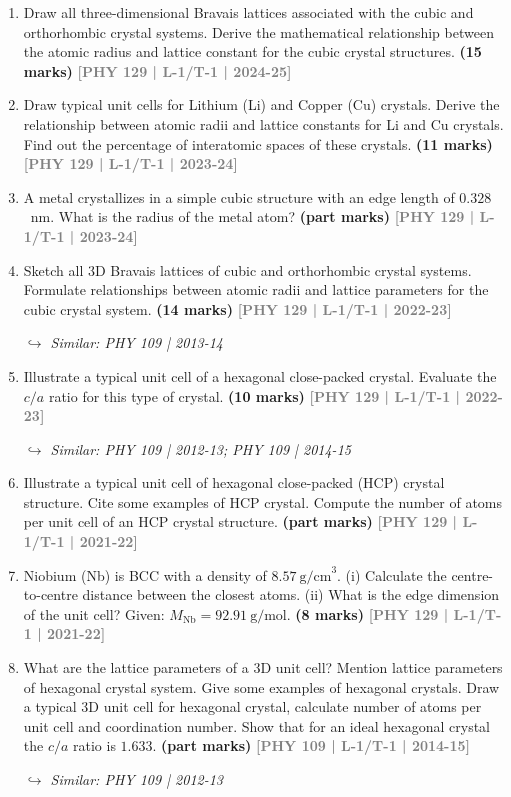 \documentclass[12pt,a3paper]{article}
\newcommand{\yr}[1]{\hfill\textcolor{gray}{\small\textbf{[#1]}}}
\newcommand{\mk}[1]{\textcolor{orange!70!black}{\small\textbf{(#1 marks)}}}
\newcommand{\variant}[1]{\par\vspace{1pt}\textcolor{blue!50!black}%
  {\footnotesize\textit{$\hookrightarrow$ Similar: #1}}}
\begin{document}
\begin{enumerate}

\item Draw all three-dimensional Bravais lattices associated with the cubic and
orthorhombic crystal systems. Derive the mathematical relationship between the
atomic radius and lattice constant for the cubic crystal structures.
\mk{15} \yr{PHY 129 | L-1/T-1 | 2024-25}


\item Draw typical unit cells for Lithium (Li) and Copper (Cu) crystals. Derive the relationship between atomic radii and lattice constants for Li and Cu crystals. Find out the percentage of interatomic spaces of these crystals.
\mk{11} \yr{PHY 129 | L-1/T-1 | 2023-24}

\item A metal crystallizes in a simple cubic structure with an edge length of $0.328$~nm. What is the radius of the metal atom?
\mk{part} \yr{PHY 129 | L-1/T-1 | 2023-24}

\item Sketch all 3D Bravais lattices of cubic and orthorhombic crystal systems. Formulate relationships between atomic radii and lattice parameters for the cubic crystal system.
\mk{14} \yr{PHY 129 | L-1/T-1 | 2022-23}
\variant{PHY 109 | 2013-14}

\item Illustrate a typical unit cell of a hexagonal close-packed crystal. Evaluate the $c/a$ ratio for this type of crystal.
\mk{10} \yr{PHY 129 | L-1/T-1 | 2022-23}
\variant{PHY 109 | 2012-13; PHY 109 | 2014-15}

\item Illustrate a typical unit cell of hexagonal close-packed (HCP) crystal structure. Cite some examples of HCP crystal. Compute the number of atoms per unit cell of an HCP crystal structure.
\mk{part} \yr{PHY 129 | L-1/T-1 | 2021-22}

\item Niobium (Nb) is BCC with a density of $8.57\ \text{g/cm}^3$. (i) Calculate the centre-to-centre distance between the closest atoms. (ii) What is the edge dimension of the unit cell? Given: $M_{\text{Nb}} = 92.91\ \text{g/mol}$.
\mk{8} \yr{PHY 129 | L-1/T-1 | 2021-22}

\item What are the lattice parameters of a 3D unit cell? Mention lattice parameters of hexagonal crystal system. Give some examples of hexagonal crystals. Draw a typical 3D unit cell for hexagonal crystal, calculate number of atoms per unit cell and coordination number. Show that for an ideal hexagonal crystal the $c/a$ ratio is $1.633$.
\mk{part} \yr{PHY 109 | L-1/T-1 | 2014-15}
\variant{PHY 109 | 2012-13}


\end{enumerate}
\end{document}
